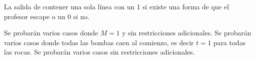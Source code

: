 \documentclass{oci}
\begin{document}
\begin{outputDescription}
  La salida de contener una sola línea con un 1 si existe una forma de que el profesor escape o un 0
  si no.
\end{outputDescription}

\begin{scoreDescription}
  Se probarán varios casos donde $M = 1$ y sin restricciones adicionales.
  Se probarán varios casos donde todas las bombas caen al comienzo, es decir $t = 1$ para todas las rocas.
  Se probarán varios casos sin restricciones adicionales.
\end{scoreDescription}

\begin{sampleDescription}
\end{sampleDescription}
\end{document}

